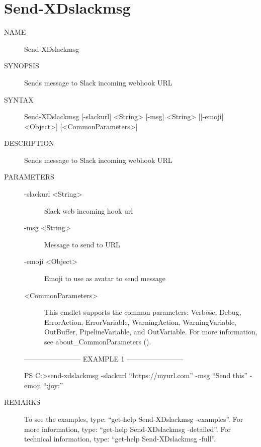 \documentclass[letterpaper,10pt,english]{sphinxmanual}
\begin{document}
\section{Send-XDslackmsg}
\label{\detokenize{cmd_send:send-xdslackmsg}}\begin{description}
\item[{NAME}] \leavevmode
Send-XDslackmsg

\item[{SYNOPSIS}] \leavevmode
Sends message to Slack incoming webhook URL

\item[{SYNTAX}] \leavevmode
Send-XDslackmsg {[}-slackurl{]} \textless{}String\textgreater{} {[}-msg{]} \textless{}String\textgreater{} {[}{[}-emoji{]} \textless{}Object\textgreater{}{]} {[}\textless{}CommonParameters\textgreater{}{]}

\item[{DESCRIPTION}] \leavevmode
Sends message to Slack incoming webhook URL

\item[{PARAMETERS}] \leavevmode\begin{description}
\item[{-slackurl \textless{}String\textgreater{}}] \leavevmode
Slack web incoming hook url

\item[{-msg \textless{}String\textgreater{}}] \leavevmode
Message to send to URL

\item[{-emoji \textless{}Object\textgreater{}}] \leavevmode
Emoji to use as avatar to send message

\item[{\textless{}CommonParameters\textgreater{}}] \leavevmode
This cmdlet supports the common parameters: Verbose, Debug,
ErrorAction, ErrorVariable, WarningAction, WarningVariable,
OutBuffer, PipelineVariable, and OutVariable. For more information, see
about\_CommonParameters ().

\end{description}

————————\textendash{} EXAMPLE 1 ————————\textendash{}

PS C:\textgreater{}send-xdslackmsg -slackurl “https://myurl.com” -msg “Send this” -emoji “:joy:”

\item[{REMARKS}] \leavevmode
To see the examples, type: “get-help Send-XDslackmsg -examples”.
For more information, type: “get-help Send-XDslackmsg -detailed”.
For technical information, type: “get-help Send-XDslackmsg -full”.

\end{description}
\end{document}
